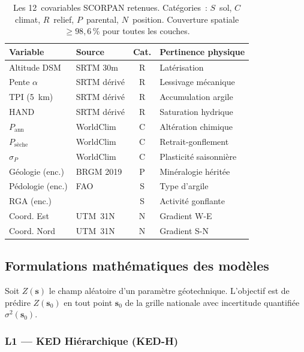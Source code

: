 \documentclass[10pt,a4paper,twocolumn]{article}
\newcommand{\bs}{\mathbf{s}}
\begin{document}
	\begin{table}[htbp]
		\centering\small
		\caption{Les 12~covariables SCORPAN retenues.
			Catégories~: $S$~sol, $C$~climat, $R$~relief, $P$~parental,
			$N$~position.
			Couverture spatiale~$\geq98{,}6$\,\% pour toutes les couches.}
		\label{tab:covariables}
		\setlength{\tabcolsep}{3pt}
		\begin{tabular}{@{}p{2.0cm}p{1.6cm}cp{2.1cm}@{}}
			\toprule
			Variable & Source & Cat. & Pertinence physique \\
			\midrule
			Altitude DSM         & SRTM 30m    & R & Latérisation \\
			Pente $\alpha$       & SRTM dérivé & R & Lessivage mécanique \\
			TPI (5~km)           & SRTM dérivé & R & Accumulation argile \\
			HAND                 & SRTM dérivé & R & Saturation hydrique \\
			$P_{\mathrm{ann}}$   & WorldClim   & C & Altération chimique \\
			$P_{\mathrm{sèche}}$ & WorldClim   & C & Retrait-gonflement \\
			$\sigma_P$           & WorldClim   & C & Plasticité saisonnière \\
			Géologie (enc.)      & BRGM 2019   & P & Minéralogie héritée \\
			Pédologie (enc.)     & FAO         & S & Type d'argile \\
			RGA (enc.)           & \cite{chassagneux1996} & S & Activité gonflante \\
			Coord. Est           & UTM~31N     & N & Gradient W-E \\
			Coord. Nord          & UTM~31N     & N & Gradient S-N \\
			\bottomrule
		\end{tabular}
	\end{table}
	
	\subsection{Formulations mathématiques des modèles}
	\label{sec:modeles}
	
	Soit $Z(\bs)$ le champ aléatoire d'un paramètre géotechnique.
	L'objectif est de prédire $Z(\bs_0)$ en tout point $\bs_0$ de la
	grille nationale avec incertitude quantifiée~$\sigma^2(\bs_0)$.
	
	\subsubsection{L1 --- KED Hiérarchique (KED-H)}
	\label{subsec:ked}
	
\end{document}
